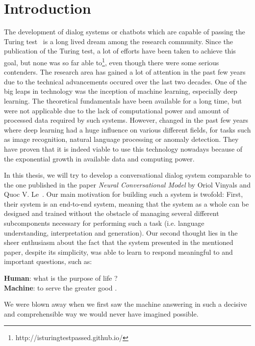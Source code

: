 \chapter{Introduction}
The development of dialog systems or chatbots which are capable of passing the Turing test~\cite{Turing:1950} is a long lived dream among the research community. Since the publication of the Turing test, a lot of efforts have been taken to achieve this goal, but none was so far able to\footnote{http://isturingtestpassed.github.io/}, even though there were some serious contenders. The research area has gained a lot of attention in the past few years due to the technical advancements occured over the last two decades. One of the big leaps in technology was the inception of machine learning, especially deep learning. The theoretical fundamentals have been available for a long time, but were not applicable due to the lack of computational power and amount of processed data required by such systems. However, changed in the past few years where deep learning had a huge influence on various different fields, for tasks such as image recognition, natural language processing or anomaly detection. They have proven that it is indeed viable to use this technology nowadays because of the exponential growth in available data and computing power.

In this thesis, we will try to develop a conversational dialog system comparable to the one published in the paper \emph{Neural Conversational Model} by Oriol Vinyals and Quoc V. Le~\cite{Vinyals:2015}. Our main motivation for building such a system is twofold: First, their system is an end-to-end system, meaning that the system as a whole can be designed and trained without the obstacle of managing several different subcomponents necessary for performing such a task (i.e. language understanding, interpretation and generation). Our second thought lies in the sheer enthusiasm about the fact that the system presented in the mentioned paper, despite its simplicity, was able to learn to respond meaningful to and important questions, such as:

\begin{center}	
	\textbf{Human}: what is the purpose of life ?\\
	\textbf{Machine}: to serve the greater good .
\end{center}

We were blown away when we first saw the machine answering in such a decisive and comprehensible way we would never have imagined possible.

